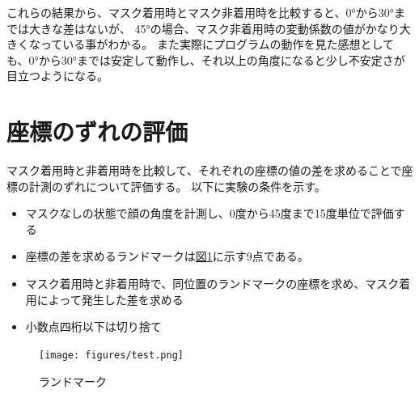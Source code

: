 \documentclass[]{jarticle}          %
\begin{document}
これらの結果から、マスク着用時とマスク非着用時を比較すると、0°から30°までは大きな差はないが、
45°の場合、マスク非着用時の変動係数の値がかなり大きくなっている事がわかる。
また実際にプログラムの動作を見た感想としても、0°から30°までは安定して動作し、それ以上の角度になると少し不安定さが目立つようになる。

\section{座標のずれの評価}
マスク着用時と非着用時を比較して、それぞれの座標の値の差を求めることで座標の計測のずれについて評価する。
以下に実験の条件を示す。
\begin{itemize}
  \item マスクなしの状態で顔の角度を計測し、0度から45度まで15度単位で評価する
  \item 座標の差を求めるランドマークは\hyperref[three]{図\ref{three}}に示す9点である。
  \item マスク着用時と非着用時で、同位置のランドマークの座標を求め、マスク着用によって発生した差を求める
  \item 小数点四桁以下は切り捨て
\end{itemize}
\begin{figure}[!ht]
  \begin{center}
    \texttt{[image: figures/test.png]}
    \caption{ランドマーク}
    \label{three}
  \end{center}
\end{figure}
\end{document}
